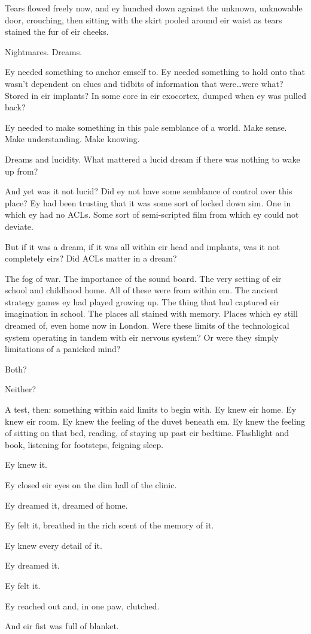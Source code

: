 Tears flowed freely now, and ey hunched down against the unknown, unknowable door, crouching, then sitting with the skirt pooled around eir waist as tears stained the fur of eir cheeks.

Nightmares. Dreams.

Ey needed something to anchor emself to. Ey needed something to hold onto that wasn't dependent on clues and tidbits of information that were\ldots{}were what? Stored in eir implants? In some core in eir exocortex, dumped when ey was pulled back?

Ey needed to make something in this pale semblance of a world. Make sense. Make understanding. Make knowing.

Dreams and lucidity. What mattered a lucid dream if there was nothing to wake up from?

And yet was it not lucid? Did ey not have some semblance of control over this place? Ey had been trusting that it was some sort of locked down sim. One in which ey had no ACLs. Some sort of semi-scripted film from which ey could not deviate.

But if it was a dream, if it was all within eir head and implants, was it not completely eirs? Did ACLs matter in a dream?

The fog of war. The importance of the sound board. The very setting of eir school and childhood home. All of these were from within em. The ancient strategy games ey had played growing up. The thing that had captured eir imagination in school. The places all stained with memory. Places which ey still dreamed of, even home now in London. Were these limits of the technological system operating in tandem with eir nervous system? Or were they simply limitations of a panicked mind?

Both?

Neither?

A test, then: something within said limits to begin with. Ey knew eir home. Ey knew eir room. Ey knew the feeling of the duvet beneath em. Ey knew the feeling of sitting on that bed, reading, of staying up past eir bedtime. Flashlight and book, listening for footsteps, feigning sleep.

Ey knew it.

Ey closed eir eyes on the dim hall of the clinic.

Ey dreamed it, dreamed of home.

Ey felt it, breathed in the rich scent of the memory of it.

Ey knew every detail of it.

Ey dreamed it.

Ey felt it.

Ey reached out and, in one paw, clutched.

And eir fist was full of blanket.
